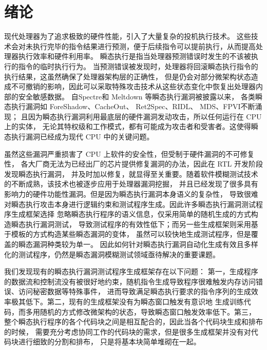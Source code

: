 \cleardoublepage

\section{绪论}

现代处理器为了追求极致的硬件性能，引入了大量复杂的投机执行技术\cite{gonzalez2010processor}。
这些技术会对未执行完毕的指令结果进行预测，便于后续指令可以提前执行，从而提高处理器执行效率和硬件利用率。
瞬态执行是指当处理器预测错误时发生的不该被执行的指令的临时执行行为。
当预测错误被发现时，处理器将回滚瞬态执行指令的执行结果，这虽然确保了处理器架构层的正确性，
但是仍会对部分微架构状态造成不可撤销的影响，因此可以采取特殊攻击技术从这些状态变化中恢复出处理器内部的安全敏感数据。
自Spectre\cite{kocher2020spectre}和 Meltdown\cite{horn2018meltdown} 等瞬态执行漏洞被披露以来，
各类瞬态执行漏洞如 ForeShadow\cite{van2018foreshadow}、CacheOut\cite{van2021cacheout}、
Ret2Spec\cite{maisuradze2018ret2spec}、RIDL\cite{mathure2023hardware}、
MDS\cite{minkin2019fallout}、FPVI\cite{ragab2021rage}不断涌现；
且因为瞬态执行漏洞利用最底层的硬件漏洞发动攻击，所以任何运行在 CPU 上的实体，
无论其特权级和工作模式，都有可能成为攻击者和受害者。这使得瞬态执行漏洞已经成为现代 CPU 中的关键问题。\par

虽然这些漏洞严重损害了 CPU 上软件的安全性，但受制于硬件漏洞的不可修复性，
各大厂商无法为已经出厂的芯片提供修复漏洞的办法，因此在 RTL 开发阶段发现瞬态执行漏洞，
并及时加以修复，就显得至关重要。随着软件模糊测试技术的不断成熟，该技术也被逐步应用于处理器漏洞挖掘，
并且已经发现了很多具有影响力的硬件功能性漏洞。但是因为瞬态执行漏洞本身语义的复杂性，
导致很难对瞬态执行攻击本身进行逻辑约束和测试程序生成。因此许多瞬态执行漏洞测试程序生成框架选择
忽略瞬态执行程序的语义信息，仅采用简单的随机生成的方式构造瞬态执行漏洞测试，
导致测试程序的有效性低下；而另一些生成框架则采用基于模板的方式构造某些瞬态漏洞的变体，
虽然可以较快地生成测试程序，但是覆盖的瞬态漏洞种类较为单一。
因此如何针对瞬态执行漏洞自动化生成有效且多样化的测试程序，仍然是瞬态漏洞模糊测试领域亟待解决的重要课题。\par

我们发现现有的瞬态执行漏洞测试程序生成框架存在以下问题：
第一，生成程序的数据流和控制流没有被很好地约束，随机指令生成导致程序很难触发内存访问错误、访问秘密数据等特殊事件，
进而导致满足瞬态执行要求的指令序列的生成效率极其低下。第二，现有的生成框架没有为瞬态窗口触发有意识地
生成训练代码，而多用随机的方式修改微架构的状态，导致瞬态窗口触发效率低下。第三，
整个瞬态执行程序的各个代码块之间是相互配合的，因此当各个代码块生成和排布的时候，
需要充分考虑协同工作的代码块的需求，但是很多生成框架并没有对代码块进行细致的分割和排布，
只是将基本块简单堆砌在一起。\par

